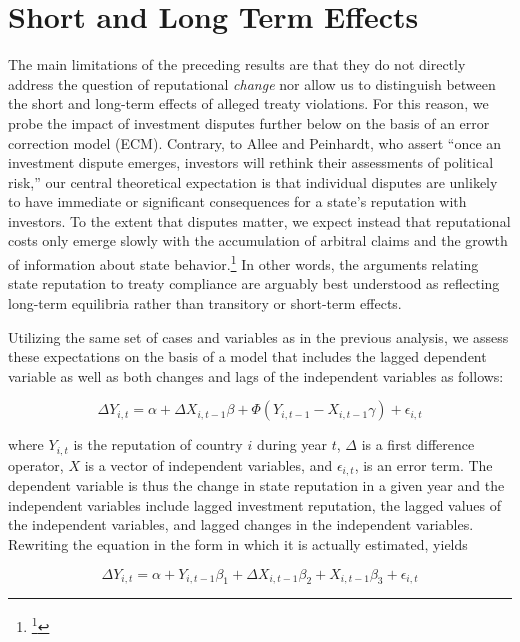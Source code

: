 \documentclass[12pt,onesided]{amsart}
\begin{document}
\section*{Short and Long Term Effects}

The main limitations of the preceding results are that they do not directly address the question of reputational \textit{change} nor allow us to distinguish between the short and long-term effects of alleged treaty violations. For this reason, we probe the impact of investment disputes further below on the basis of an error correction model (ECM). Contrary, to Allee and Peinhardt, who assert ``once an investment dispute emerges, investors will rethink their assessments of political risk,'' our central theoretical expectation is that individual disputes are unlikely to have immediate or significant consequences for a state's reputation with investors. To the extent that disputes matter, we expect instead that reputational costs only emerge slowly with the accumulation of arbitral claims and the growth of information about state behavior.\footnote{\footnote{\citet[p. 402]{allee:peinhardt:2011}}} In other words, the arguments relating state reputation to treaty compliance are arguably best understood as reflecting long-term equilibria rather than transitory or short-term effects.

Utilizing the same set of cases and variables as in the previous analysis, we assess these expectations on the basis of a model that includes the lagged dependent variable as well as both changes and lags of the independent variables as follows:

\begin{equation}
\Delta Y_{i,t} = \alpha + \Delta X_{i,t-1} \beta + \Phi(Y_{i,t-1} - X_{i,t-1} \gamma) + \epsilon_{i,t}
\end{equation}

where $Y_{i,t}$ is the reputation of country $i$ during year $t$, $\Delta$ is a first difference operator, $X$ is a vector of independent variables, and $\epsilon_{i,t}$, is an error term. The dependent variable is thus the change in state reputation in a given year and the independent variables include lagged investment reputation, the lagged values of the independent variables, and lagged changes in the independent variables. Rewriting the equation in the form in which it is actually estimated, yields

\begin{equation}
\Delta Y_{i,t} = \alpha + Y_{i,t-1} \beta_{1} + \Delta X_{i,t-1} \beta_{2} + X_{i, t-1} \beta_{3} + \epsilon_{i,t}
\end{equation}
\end{document}
